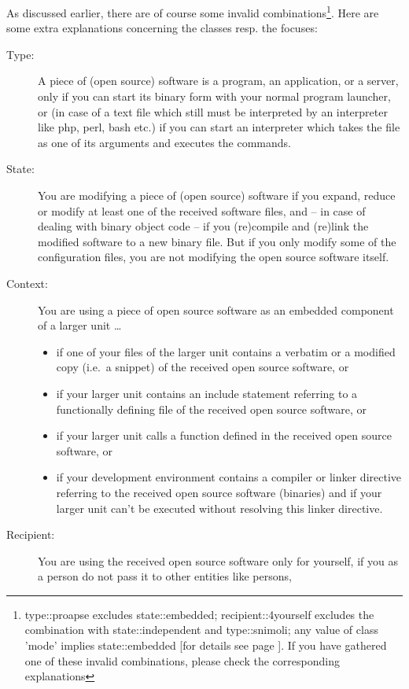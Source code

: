 
As discussed earlier, there are of course some invalid
combinations\footnote{type::proapse excludes state::embedded;
recipient::4yourself excludes the combination with state::independent and
type::snimoli; any value of class 'mode' implies state::embedded [for details
see page \pageref{InvalidFinderTokenCombinations}]. If you have gathered one of
these invalid combinations, please check the corresponding explanations}. Here
are some extra explanations concerning the classes resp. the focuses:

\begin{description}
\item[Type:] A piece of (open source) software is a program, an application, or
a server, only if you can start its binary form with your normal program
launcher, or (in case of a text file which still must be interpreted by an
interpreter like php, perl, bash etc.) if you can start an interpreter which
takes the file as one of its arguments and executes the commands.
\item[State:] You are modifying a piece of (open source) software if you expand,
reduce or modify at least one of the received software files, and -- in case of
dealing with binary object code -- if you (re)compile and (re)link the modified
software to a new binary file. But if you only modify some of the configuration
files, you are not modifying the open source software itself.
\item[Context:] You are using a piece of open source software as an embedded
component of a larger unit \ldots
  \begin{itemize}
  \item  if one of your files of the larger unit contains a verbatim or a
  modified copy (i.e.\ a snippet) of the received open source software, or
  \item if your larger unit contains an include statement referring to a
  functionally defining file of the received open source software, or
  \item if your larger unit calls a function defined in the received open source
  software, or
  \item if your development environment contains a compiler or linker directive
  referring to the received open source software (binaries) and if your larger
  unit can't be executed without resolving this linker directive.
  \end{itemize}
\item[Recipient:] You are using the received open source software only for
yourself, if you as a person do not pass it to other entities like persons,

\end{description}
